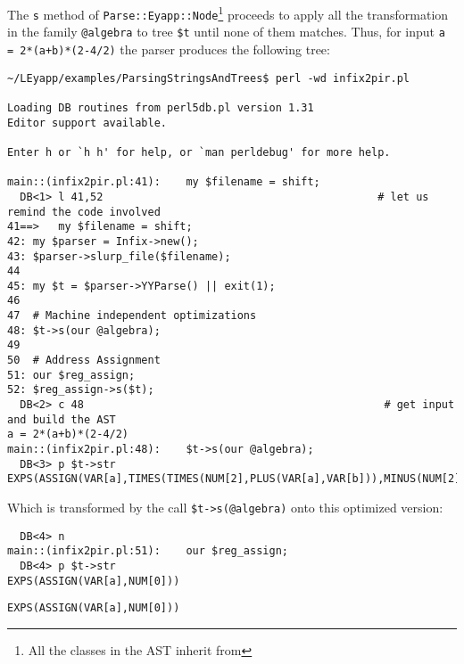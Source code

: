 The \verb|s| method of 
\verb|Parse::Eyapp::Node|\footnote{All the classes in the AST
inherit from }
proceeds to apply all the transformation in the family
\verb|@algebra| to tree \verb|$t|
until none of them matches. Thus, for input
\verb|a = 2*(a+b)*(2-4/2)| the parser
produces the following tree:
\begin{verbatim}
~/LEyapp/examples/ParsingStringsAndTrees$ perl -wd infix2pir.pl

Loading DB routines from perl5db.pl version 1.31
Editor support available.

Enter h or `h h' for help, or `man perldebug' for more help.

main::(infix2pir.pl:41):    my $filename = shift;
  DB<1> l 41,52                                           # let us remind the code involved
41==>   my $filename = shift;
42: my $parser = Infix->new(); 
43: $parser->slurp_file($filename);
44  
45: my $t = $parser->YYParse() || exit(1);
46  
47  # Machine independent optimizations
48: $t->s(our @algebra);  
49  
50  # Address Assignment 
51: our $reg_assign;
52: $reg_assign->s($t);
  DB<2> c 48                                               # get input and build the AST
a = 2*(a+b)*(2-4/2)
main::(infix2pir.pl:48):    $t->s(our @algebra);  
  DB<3> p $t->str
EXPS(ASSIGN(VAR[a],TIMES(TIMES(NUM[2],PLUS(VAR[a],VAR[b])),MINUS(NUM[2],DIV(NUM[4],NUM[2])))))
\end{verbatim}
Which is transformed by the call \verb|$t->s(@algebra)| onto this optimized version:
\begin{verbatim}
  DB<4> n
main::(infix2pir.pl:51):    our $reg_assign;
  DB<4> p $t->str
EXPS(ASSIGN(VAR[a],NUM[0]))
\end{verbatim}
\begin{verbatim}
EXPS(ASSIGN(VAR[a],NUM[0]))
\end{verbatim}




